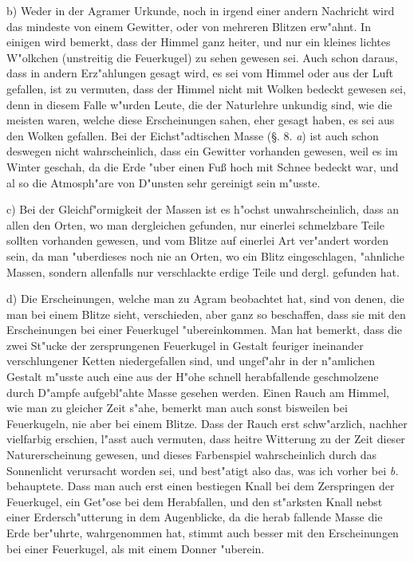 \documentclass[a4paper, 11pt, oneside, polutonikogreek, german]{article}
\begin{document}
b) Weder in der Agramer Urkunde, noch in irgend einer andern Nachricht wird das mindeste von einem Gewitter, oder von mehreren Blitzen erw"ahnt. In einigen wird bemerkt, dass der Himmel ganz heiter, und nur ein kleines lichtes W"olkchen (unstreitig die Feuerkugel) zu sehen gewesen sei. Auch schon daraus, dass in andern Erz"ahlungen gesagt wird, es sei vom Himmel oder aus der Luft gefallen, ist zu vermuten, dass der Himmel nicht mit Wolken bedeckt gewesen sei, denn in diesem Falle w"urden Leute, die der Naturlehre unkundig sind, wie die meisten waren, welche diese Erscheinungen sahen, eher gesagt haben, es sei aus den Wolken gefallen. Bei der Eichst"adtischen Masse (§. 8. \emph{a}) ist auch schon deswegen nicht wahrscheinlich, dass ein Gewitter vorhanden gewesen, weil es im Winter geschah, da die Erde "uber einen Fuß hoch mit Schnee bedeckt war, und al so die Atmosph"are von D"unsten sehr gereinigt sein m"usste.

c) Bei der Gleichf"ormigkeit der Massen ist es h"ochst unwahrscheinlich, dass an allen den Orten, wo man dergleichen gefunden, nur einerlei schmelzbare Teile sollten vorhanden gewesen, und vom Blitze auf einerlei Art ver"andert worden sein, da man "uberdieses noch nie an Orten, wo ein Blitz eingeschlagen, "ahnliche Massen, sondern allenfalls nur verschlackte erdige Teile und dergl. gefunden hat.

d) Die Erscheinungen, welche man zu Agram beobachtet hat, sind von denen, die man bei einem Blitze sieht, verschieden, aber ganz so beschaffen, dass sie mit den Erscheinungen bei einer Feuerkugel "ubereinkommen. Man hat bemerkt, dass die zwei St"ucke der zersprungenen Feuerkugel in Gestalt feuriger ineinander verschlungener Ketten niedergefallen sind, und ungef"ahr in der n"amlichen Gestalt m"usste auch eine aus der H"ohe schnell herabfallende geschmolzene durch D"ampfe aufgebl"ahte Masse gesehen werden. Einen Rauch am Himmel, wie man zu gleicher Zeit s"ahe, bemerkt man auch sonst bisweilen bei Feuerkugeln, nie aber bei einem Blitze. Dass der Rauch erst schw"arzlich, nachher vielfarbig erschien, l"asst auch vermuten, dass heitre Witterung zu der Zeit dieser Naturerscheinung gewesen, und dieses Farbenspiel wahrscheinlich durch das Sonnenlicht verursacht worden sei, und best"atigt also das, was ich vorher bei \emph{b.} behauptete. Dass man auch erst einen bestiegen Knall bei dem Zerspringen der Feuerkugel, ein Get"ose bei dem Herabfallen, und den st"arksten Knall nebst einer Erdersch"utterung in dem Augenblicke, da die herab fallende Masse die Erde ber"uhrte, wahrgenommen hat, stimmt auch besser mit den Erscheinungen bei einer Feuerkugel, als mit einem Donner "uberein.
\end{document}

